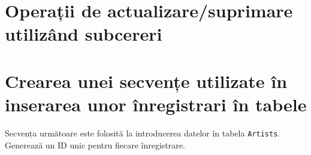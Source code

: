 \documentclass[a4paper, oneside, 12pt]{article}
\begin{document}
\begin{center}

\minipage{\linewidth}

\endminipage

\minipage{\linewidth}

\endminipage

\minipage{\linewidth}

\endminipage

\minipage{\linewidth}

\endminipage

\minipage{\linewidth}

\endminipage

\end{center}

\section{Operații de actualizare/suprimare utilizând subcereri}

\begin{center}

\minipage{\linewidth}

\endminipage

\end{center}

\section{Crearea unei secvențe utilizate în inserarea unor înregistrari în tabele}

Secvența următoare este folosită la introducerea datelor în tabela
\texttt{Artists}. Generează un ID unic pentru fiecare înregistrare.

\begin{center}

\minipage{\linewidth}

\endminipage

\minipage{\linewidth}

\endminipage

\end{center}
\end{document}
